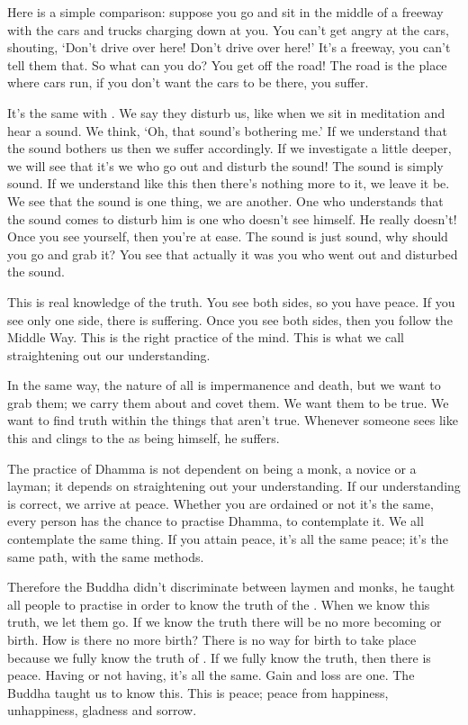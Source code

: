 Here is a simple comparison: suppose you go and sit in the middle of a freeway with the cars and trucks charging down at you. You can't get angry at the cars, shouting, `Don't drive over here! Don't drive over here!' It's a freeway, you can't tell them that. So what can you do? You get off the road! The road is the place where cars run, if you don't want the cars to be there, you suffer. 

It's the same with . We say they disturb us, like when we sit in meditation and hear a sound. We think, `Oh, that sound's bothering me.' If we understand that the sound bothers us then we suffer accordingly. If we investigate a little deeper, we will see that it's we who go out and disturb the sound! The sound is simply sound. If we understand like this then there's nothing more to it, we leave it be. We see that the sound is one thing, we are another. One who understands that the sound comes to disturb him is one who doesn't see himself. He really doesn't! Once you see yourself, then you're at ease. The sound is just sound, why should you go and grab it? You see that actually it was you who went out and disturbed the sound. 

This is real knowledge of the truth. You see both sides, so you have peace. If you see only one side, there is suffering. Once you see both sides, then you follow the Middle Way. This is the right practice of the mind. This is what we call straightening out our understanding. 

In the same way, the nature of all  is impermanence and death, but we want to grab them; we carry them about and covet them. We want them to be true. We want to find truth within the things that aren't true. Whenever someone sees like this and clings to the  as being himself, he suffers. 

The practice of Dhamma is not dependent on being a monk, a novice or a layman; it depends on straightening out your understanding. If our understanding is correct, we arrive at peace. Whether you are ordained or not it's the same, every person has the chance to practise Dhamma, to contemplate it. We all contemplate the same thing. If you attain peace, it's all the same peace; it's the same path, with the same methods. 

Therefore the Buddha didn't discriminate between laymen and monks, he taught all people to practise in order to know the truth of the . When we know this truth, we let them go. If we know the truth there will be no more becoming or birth. How is there no more birth? There is no way for birth to take place because we fully know the truth of . If we fully know the truth, then there is peace. Having or not having, it's all the same. Gain and loss are one. The Buddha taught us to know this. This is peace; peace from happiness, unhappiness, gladness and sorrow. 

